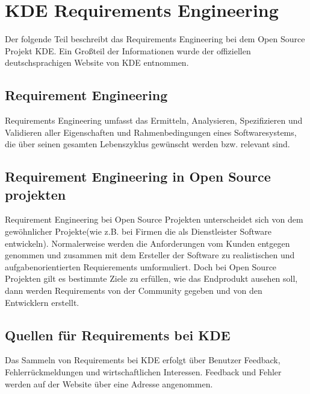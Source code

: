


\section{KDE Requirements Engineering}

Der folgende Teil beschreibt das Requirements Engineering bei dem Open Source
Projekt KDE. Ein Großteil der Informationen wurde der offiziellen
deutschsprachigen Website von KDE entnommen\cite{1}. 

\subsection{Requirement Engineering}
Requirements Engineering umfasst das Ermitteln, Analysieren, Spezifizieren und
Validieren aller Eigenschaften und Rahmenbedingungen eines Softwaresystems, die
über seinen gesamten Lebenszyklus gewünscht werden bzw. relevant sind\cite{2}.  

\subsection{Requirement Engineering in Open Source projekten}
Requirement Engineering bei Open Source Projekten unterscheidet sich von dem
gewöhnlicher Projekte(wie z.B. bei Firmen die als Dienstleister Software
entwickeln). Normalerweise werden die Anforderungen vom Kunden entgegen genommen
und zusammen mit dem Ersteller der Software zu realistischen und
aufgabenorientierten Requierements umformuliert. Doch bei Open Source Projekten
gilt es bestimmte Ziele zu erfüllen, wie das Endprodukt ausehen soll, dann
werden Requirements von der Community gegeben und von den Entwicklern erstellt.


\subsection{Quellen für Requirements bei KDE}
Das Sammeln von Requirements bei KDE erfolgt über Benutzer Feedback,
Fehlerrückmeldungen und wirtschaftlichen Interessen. Feedback und Fehler werden
auf der Website über eine Adresse angenommen\cite{3}.

